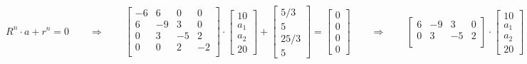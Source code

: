 $R^n\cdot a +r^n=0 \qquad\Rightarrow\qquad
\begin{bmatrix}
	-6 & 6 & 0 & 0\\
	6 & -9 & 3 & 0\\
	0 & 3 & -5 & 2\\
	0 & 0 & 2 & -2\\
\end{bmatrix}\cdot
\begin{bmatrix}
	10\\
	a_1\\
	a_2\\
	20
\end{bmatrix}+
\begin{bmatrix}
	5/3\\
	5\\
	25/3\\
	5
\end{bmatrix}=
\begin{bmatrix}
	0\\
	0\\
	0\\
	0
\end{bmatrix}\qquad\Rightarrow\qquad
\begin{bmatrix}
	6 & -9 & 3 & 0\\
	0 & 3 & -5 & 2\\
\end{bmatrix}\cdot
\begin{bmatrix}
	10\\
	a_1\\
	a_2\\
	20
\end{bmatrix}+
\begin{bmatrix}
	5/3\\
	5\\
	25/3\\
	5
\end{bmatrix}=
\begin{bmatrix}
	0\\
	0\\
	0\\
	0
\end{bmatrix}
$\\
\\

